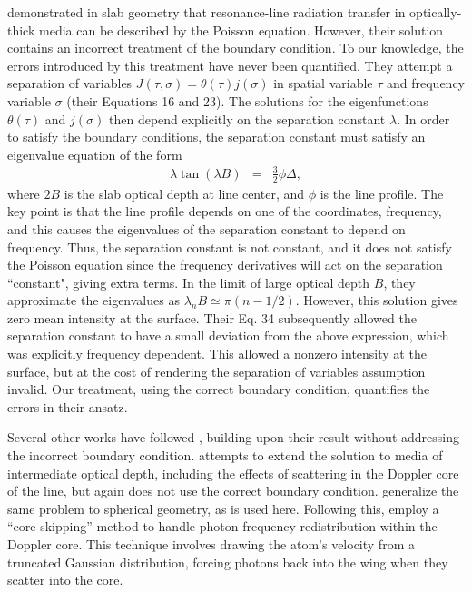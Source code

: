 \documentclass{aastex63}
\newcommand{\be}{\begin{eqnarray}}
\newcommand{\ee}{\end{eqnarray}}
\begin{document}
\citet{1973MNRAS.162...43H} demonstrated in slab geometry that resonance-line radiation transfer in optically-thick media can be described by the Poisson equation. However, their solution contains an incorrect treatment of the boundary condition. To our knowledge, the errors introduced by this treatment have never been quantified. They attempt a separation of variables $J(\tau,\sigma) = \theta(\tau) j(\sigma)$ in spatial variable $\tau$ and frequency variable $\sigma$ (their Equations 16 and 23). The solutions for the eigenfunctions $\theta(\tau)$ and $j(\sigma)$ then depend explicitly on the separation constant $\lambda$. In order to satisfy the boundary conditions, the separation constant must satisfy an eigenvalue equation of the form
\be
\lambda \tan(\lambda B) & = & \frac{3}{2} \phi \Delta,
\label{eq:evalue}
\ee
where $2B$ is the slab optical depth at line center, and $\phi$ is the line profile. The key point is that the line profile depends on one of the coordinates, frequency, and this causes the eigenvalues of the separation constant to depend on frequency. Thus, the separation constant is not constant, and it does not satisfy the Poisson equation since the frequency derivatives will act on the separation ``constant", giving extra terms. In the limit of large optical depth $B$, they approximate the eigenvalues as $\lambda_n B \simeq \pi (n-1/2)$. However, this solution gives zero mean intensity at the surface. Their Eq. 34 subsequently allowed the separation constant to have a small deviation from the above expression, which was explicitly frequency dependent. This allowed a nonzero intensity at the surface, but at the cost of rendering the separation of variables assumption invalid. Our treatment, using the correct boundary condition, quantifies the errors in their ansatz.

Several other works have followed \citet{1973MNRAS.162...43H}, building upon their result without addressing the incorrect boundary condition. \citet{1990ApJ...350..216N} attempts to extend the solution to media of intermediate optical depth, including the effects of scattering in the Doppler core of the line, but again does not use the correct boundary condition. \citet{2006ApJ...649...14D} generalize the same problem to spherical geometry, as is used here. Following this, \citet{2015MNRAS.449.4336S} employ a ``core skipping'' method to handle photon frequency redistribution within the Doppler core. This technique involves drawing the atom's velocity from a truncated Gaussian distribution, forcing photons back into the wing when they scatter into the core. %
\end{document}
